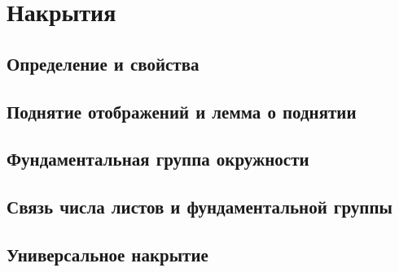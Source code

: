 \section{Накрытия}
\subsection{Определение и свойства}

\subsection{Поднятие отображений и лемма о поднятии}

\subsection{Фундаментальная группа окружности}

\subsection{Связь числа листов и фундаментальной группы}

\subsection{Универсальное накрытие}

